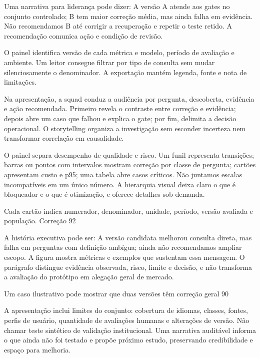 Uma narrativa para liderança pode dizer: A versão A atende aos gates no conjunto controlado; B tem maior correção média, mas ainda falha em evidência. Não recomendamos B até corrigir a recuperação e repetir o teste retido. A recomendação comunica ação e condição de revisão.

O painel identifica versão de cada métrica e modelo, período de avaliação e ambiente. Um leitor consegue filtrar por tipo de consulta sem mudar silenciosamente o denominador. A exportação mantém legenda, fonte e nota de limitações.

Na apresentação, a squad conduz a audiência por pergunta, descoberta, evidência e ação recomendada. Primeiro revela o contraste entre correção e evidência; depois abre um caso que falhou e explica o gate; por fim, delimita a decisão operacional. O storytelling organiza a investigação sem esconder incerteza nem transformar correlação em causalidade.

O painel separa desempenho de qualidade e risco. Um funil representa transições; barras ou pontos com intervalos mostram correção por classe de pergunta; cartões apresentam custo e p95; uma tabela abre casos críticos. Não juntamos escalas incompatíveis em um único número. A hierarquia visual deixa claro o que é bloqueador e o que é otimização, e oferece detalhes sob demanda.

Cada cartão indica numerador, denominador, unidade, período, versão avaliada e população. Correção 92%

A história executiva pode ser: A versão candidata melhorou consulta direta, mas falha em perguntas com definição ambígua; ainda não recomendamos ampliar escopo. A figura mostra métricas e exemplos que sustentam essa mensagem. O parágrafo distingue evidência observada, risco, limite e decisão, e não transforma a avaliação do protótipo em alegação geral de mercado.

Um caso ilustrativo pode mostrar que duas versões têm correção geral 90%

A apresentação inclui limites do conjunto: cobertura de idiomas, classes, fontes, perfis de usuário, quantidade de avaliações humanas e alterações de versão. Não chamar teste sintético de validação institucional. Uma narrativa auditável informa o que ainda não foi testado e propõe próximo estudo, preservando credibilidade e espaço para melhoria.

